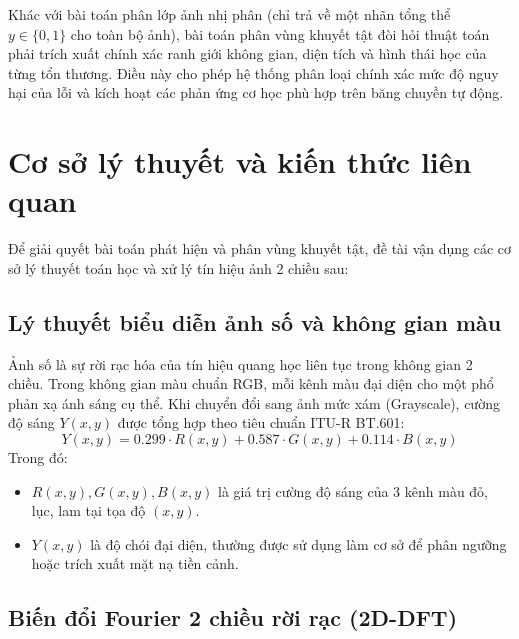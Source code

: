 Khác với bài toán phân lớp ảnh nhị phân (chỉ trả về một nhãn tổng thể $y \in \{0, 1\}$ cho toàn bộ ảnh), bài toán phân vùng khuyết tật đòi hỏi thuật toán phải trích xuất chính xác ranh giới không gian, diện tích và hình thái học của từng tổn thương. Điều này cho phép hệ thống phân loại chính xác mức độ nguy hại của lỗi và kích hoạt các phản ứng cơ học phù hợp trên băng chuyền tự động.

\section{Cơ sở lý thuyết và kiến thức liên quan}

Để giải quyết bài toán phát hiện và phân vùng khuyết tật, đề tài vận dụng các cơ sở lý thuyết toán học và xử lý tín hiệu ảnh 2 chiều sau:

\subsection{Lý thuyết biểu diễn ảnh số và không gian màu}

Ảnh số là sự rời rạc hóa của tín hiệu quang học liên tục trong không gian 2 chiều. Trong không gian màu chuẩn RGB, mỗi kênh màu đại diện cho một phổ phản xạ ánh sáng cụ thể. Khi chuyển đổi sang ảnh mức xám (Grayscale), cường độ sáng $Y(x, y)$ được tổng hợp theo tiêu chuẩn ITU-R BT.601:
\begin{equation}
    Y(x, y) = 0.299 \cdot R(x, y) + 0.587 \cdot G(x, y) + 0.114 \cdot B(x, y)
\end{equation}
Trong đó:
\begin{itemize}
    \item $R(x, y), G(x, y), B(x, y)$ là giá trị cường độ sáng của 3 kênh màu đỏ, lục, lam tại tọa độ $(x, y)$.
    \item $Y(x, y)$ là độ chói đại diện, thường được sử dụng làm cơ sở để phân ngưỡng hoặc trích xuất mặt nạ tiền cảnh.
\end{itemize}

\subsection{Biến đổi Fourier 2 chiều rời rạc (2D-DFT)}

